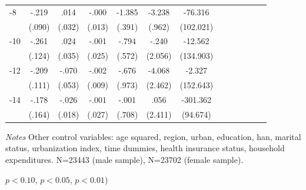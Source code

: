 \begin{table}[p]
\begin{adjustbox}{max width=\linewidth}
\begin{threeparttable}
{\begin{tabular}{l*{6}{S S}}
-8             &    -.219\sym{**} &     .014         &    -.000         &   -1.385\sym{***}&   -3.238\sym{***}&  -76.316         \\
                &   (.090)         &   (.032)         &   (.013)         &   (.391)         &   (.962)         &(102.021)         \\
-10            &    -.261\sym{**} &     .024         &    -.001         &    -.794         &    -.240         &  -12.562         \\
                &   (.124)         &   (.035)         &   (.025)         &   (.572)         &  (2.056)         &(134.903)         \\
-12           &    -.209\sym{*}  &    -.070         &    -.002         &    -.676         &   -4.068\sym{*}  &   -2.327         \\
                &   (.111)         &   (.053)         &   (.009)         &   (.973)         &  (2.462)         &(152.643)         \\
-14           &    -.178         &    -.026         &    -.001         &    -.001         &     .056         & -301.362\sym{***}\\
                &   (.164)         &   (.018)         &   (.027)         &   (.708)         &  (2.411)         & (94.674)         \\     
\bottomrule
\end{tabular}
\begin{tablenotes}
\item \textit{Notes} Other control variables: age squared, region, urban, education, han, marital status, urbanization index, time dummies, health insurance status, household expenditures. N=23443 (male sample), N=23702 (female sample).
\item \sym{*} \(p<0.10\), \sym{**} \(p<0.05\), \sym{***} \(p<0.01\))
\end{tablenotes}
}
\end{threeparttable}
\end{adjustbox}
\end{table}

